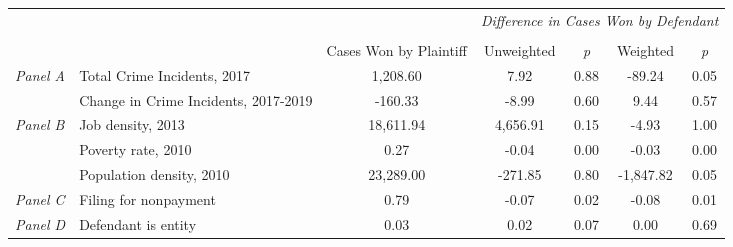 \begin{tabular}{llccccc}
\toprule
 &  & \textit{} & \multicolumn{4}{c}{\textit{Difference in Cases Won by Defendant}} \\
\cline{4-7}
\\
 &  & Cases Won by Plaintiff & Unweighted & \emph{p} & Weighted & \emph{p} \\
\midrule
\multirow[c]{2}{.75cm}{\textit{Panel A}} & Total Crime Incidents, 2017 & 1,208.60 & 7.92 & 0.88 & -89.24 & 0.05 \\
 & Change in Crime Incidents, 2017-2019 & -160.33 & -8.99 & 0.60 & 9.44 & 0.57 \\
\cline{1-7}
\multirow[c]{3}{.75cm}{\textit{Panel B}} & Job density, 2013 & 18,611.94 & 4,656.91 & 0.15 & -4.93 & 1.00 \\
 & Poverty rate, 2010 & 0.27 & -0.04 & 0.00 & -0.03 & 0.00 \\
 & Population density, 2010 & 23,289.00 & -271.85 & 0.80 & -1,847.82 & 0.05 \\
\cline{1-7}
\textit{Panel C} & Filing for nonpayment & 0.79 & -0.07 & 0.02 & -0.08 & 0.01 \\
\cline{1-7}
\textit{Panel D} & Defendant is entity & 0.03 & 0.02 & 0.07 & 0.00 & 0.69 \\
\cline{1-7}
\bottomrule
\end{tabular}
